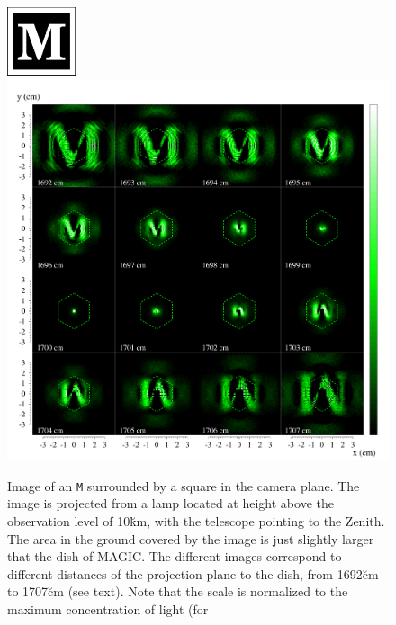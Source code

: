 \documentclass[12pt]{book}
\def\MAGIC{MAGIC}
\begin{document}
\begin{figure}[p]
  \centering
  {\mbox{}\hspace{10cm}\includegraphics[width=2cm]{testbmp.pdf}}\\[-25pt]
  \includegraphics[width=\textwidth]{Mspots.pdf}
  \caption[Image of an \texttt{M} surrounded by a square in the camera 
  plane]{Image of an \texttt{M} surrounded by a square in the camera
    plane. The image is projected from a lamp located at height above
    the observation level of 10\u{km}, with the telescope pointing to
    the Zenith. The area in the ground covered by the image is just
    slightly larger that the dish of \MAGIC. The different images
    correspond to different distances of the projection plane to the
    dish, from 1692\u{cm} to 1707\u{cm} (see text). Note that the
    scale is normalized to the maximum concentration of light (for
}
\end{figure}
\end{document}
